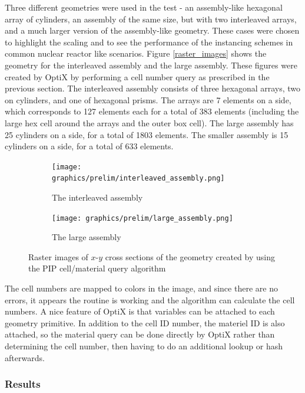 Three different geometries were used in the test - an assembly-like hexagonal array of cylinders, an assembly of the same size, but with two interleaved arrays, and a much larger version of the assembly-like geometry. These cases were chosen to highlight the scaling and to see the performance of the instancing schemes in common nuclear reactor like scenarios.  Figure \ref{raster_images} shows the 	geometry for the interleaved assembly and the large assembly.  These figures were created by OptiX by performing a cell number query as prescribed in the previous section.  The interleaved assembly consists of three hexagonal arrays, two on cylinders, and one of hexagonal prisms.  The arrays are 7 elements on a side, which corresponds to 127 elements each for a total of 383 elements (including the large hex cell around the arrays and the outer box cell).  The large assembly has 25 cylinders on a side, for a total of 1803 elements.  The smaller assembly is 15 cylinders on a side, for a total of 633 elements.

\begin{figure}[h!]
\centering
\begin{subfigure}{.5\textwidth}
  \centering
  \texttt{[image: graphics/prelim/interleaved\_assembly.png]}
  \caption{The interleaved assembly}
  \label{fig:sub1}
\end{subfigure}%
\begin{subfigure}{.5\textwidth}
  \centering
  \texttt{[image: graphics/prelim/large\_assembly.png]}
  \caption{The large assembly}
  \label{fig:sub2}
\end{subfigure}
\caption{Raster images of $x$-$y$ cross sections of the geometry created by using the PIP cell/material query algorithm \label{raster_images}}
\label{fig:test}
\end{figure}

The cell numbers are mapped to colors in the image, and since there are no errors, it appears the routine is working and the algorithm can calculate the cell numbers.  A nice feature of OptiX is that variables can be attached to each geometry primitive.  In addition to the cell ID number, the materiel ID is also attached, so the material query can be done directly by OptiX rather than determining the cell number, then having to do an additional lookup or hash afterwards.

\subsubsection{Results}

